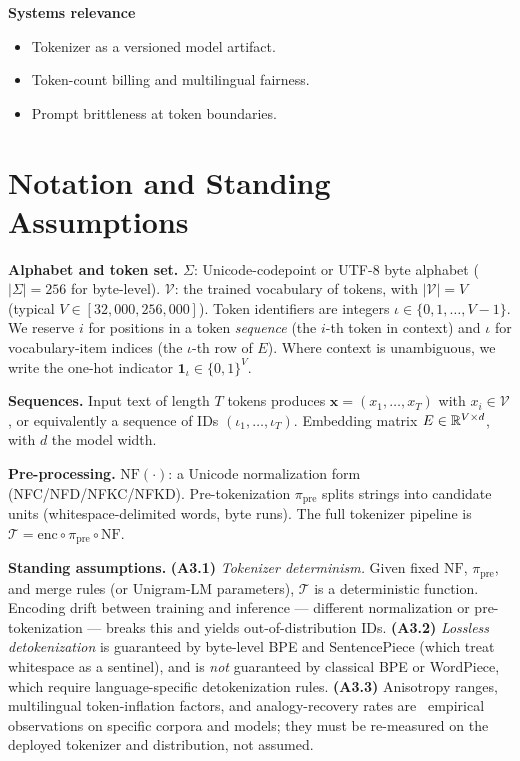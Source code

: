 \textbf{Systems relevance}
\begin{itemize}
  \item Tokenizer as a versioned model artifact.
  \item Token-count billing and multilingual fairness.
  \item Prompt brittleness at token boundaries.
\end{itemize}

\section{Notation and Standing Assumptions}
\label{sec:ch4-notation}

\begin{notationbox}
\textbf{Alphabet and token set.}
$\Sigma$: Unicode-codepoint or UTF-8 byte alphabet ($|\Sigma| = 256$
for byte-level). $\mathcal{V}$: the trained vocabulary of tokens,
with $|\mathcal{V}| = V$ (typical $V \in [32{,}000, 256{,}000]$).
Token identifiers are integers $\iota \in \{0, 1, \dots, V-1\}$. We
reserve $i$ for positions in a token \emph{sequence} (the $i$-th
token in context) and $\iota$ for vocabulary-item indices (the
$\iota$-th row of $E$). Where context is unambiguous, we write the
one-hot indicator $\mathbf{1}_\iota \in \{0,1\}^V$.

\textbf{Sequences.}
Input text of length $T$ tokens produces
$\mathbf{x} = (x_1, \dots, x_T)$ with $x_i \in \mathcal{V}$, or
equivalently a sequence of IDs $(\iota_1, \dots, \iota_T)$.
Embedding matrix $E \in \mathbb{R}^{V \times d}$, with $d$ the model width.

\textbf{Pre-processing.}
$\mathrm{NF}(\cdot)$: a Unicode normalization form
(NFC/NFD/NFKC/NFKD). Pre-tokenization $\pi_{\mathrm{pre}}$ splits
strings into candidate units (whitespace-delimited words, byte
runs). The full tokenizer pipeline is
$\mathcal{T} = \mathrm{enc}\circ\pi_{\mathrm{pre}}\circ\mathrm{NF}$.

\textbf{Standing assumptions.}
\textbf{(A3.1)} \emph{Tokenizer determinism.} Given fixed
$\mathrm{NF}$, $\pi_{\mathrm{pre}}$, and merge rules (or Unigram-LM
parameters), $\mathcal{T}$ is a deterministic function. Encoding
drift between training and inference --- different normalization or
pre-tokenization --- breaks this and yields out-of-distribution IDs.
\textbf{(A3.2)} \emph{Lossless detokenization} is guaranteed by
byte-level BPE and SentencePiece (which treat whitespace as a
sentinel), and is \emph{not} guaranteed by classical BPE or
WordPiece, which require language-specific detokenization rules.
\textbf{(A3.3)} Anisotropy ranges, multilingual token-inflation
factors, and analogy-recovery rates are \Emp\ empirical observations
on specific corpora and models; they must be re-measured on the
deployed tokenizer and distribution, not assumed.
\end{notationbox}

